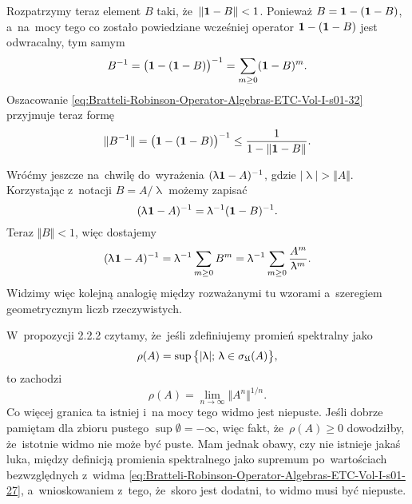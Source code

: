 \documentclass[a4paper,11pt]{article}
\renewcommand{\lambda}{\uplambda}
\begin{document}
Rozpatrzymy teraz element $B$ taki, że~$\Vert \mathbf{1} - B \Vert < 1$. Ponieważ
$B = \mathbf{1} - ( \mathbf{1} - B )$, a~na~mocy tego co zostało
powiedziane wcześniej operator $\mathbf{1} - ( \mathbf{1} - B )$ jest
odwracalny, tym samym
\begin{equation}
  \label{eq:Bratteli-Robinson-Operator-Algebras-ETC-Vol-I-s01-33}
  B^{ -1 } =
  \big( \mathbf{1} - ( \mathbf{1} - B ) \big)^{ -1 } =
  \sum_{ m \geq 0 } ( \mathbf{1} - B )^{ m }.
\end{equation}
Oszacowanie \eqref{eq:Bratteli-Robinson-Operator-Algebras-ETC-Vol-I-s01-32}
przyjmuje teraz formę
\begin{equation}
  \label{eq:Bratteli-Robinson-Operator-Algebras-ETC-Vol-I-s01-34}
  \Vert B^{ -1 } \Vert =
  \big( \mathbf{1} - ( \mathbf{1} - B ) \big)^{ -1 } \leq
  \frac{ 1 }{ 1 - \Vert \mathbf{1} - B \Vert }.
\end{equation}

Wróćmy jeszcze na~chwilę do~wyrażenia $( \lambda \UnitAlg - A )^{ -1 }$, gdzie
$| \lambda | > \Vert A \Vert$. Korzystając z~notacji $B = A / \lambda$ możemy zapisać
\begin{equation}
  \label{eq:Bratteli-Robinson-Operator-Algebras-ETC-Vol-I-s01-35}
  ( \lambda \HorSpaceOne \UnitAlg - A )^{ -1 } =
  \lambda^{ -1 } ( \UnitAlg - B )^{ -1 }.
\end{equation}
Teraz $\Vert B \Vert < 1$, więc dostajemy
\begin{equation}
  \label{eq:Bratteli-Robinson-Operator-Algebras-ETC-Vol-I-s01-36}
  ( \lambda \HorSpaceOne \UnitAlg - A )^{ -1 } =
  \lambda^{ -1 } \sum_{ m \geq 0 } B^{ m } =
  \lambda^{ -1 } \sum_{ m \geq 0 } \frac{ A^{ m } }{ \lambda^{ m } }.
\end{equation}
Widzimy więc kolejną analogię między rozważanymi tu wzorami a~szeregiem
geometrycznym liczb rzeczywistych.

\VerSpaceFour





\noindent
{} W~propozycji 2.2.2 czytamy, że~jeśli zdefiniujemy promień spektralny
jako
\begin{equation}
  \label{eq:Bratteli-Robinson-Operator-Algebras-ETC-Vol-I-s01-37}
  \rho( A ) =
  \sup\big\{ | \lambda |; \, \lambda \in \sigma_{ \Ufrak }( A ) \big\},
\end{equation}
to zachodzi
\begin{equation}
  \label{eq:Bratteli-Robinson-Operator-Algebras-ETC-Vol-I-s01-38}
  \rho( A ) =
  \lim_{ n \to \infty } \Vert A^{ n } \Vert^{ 1 / n }.
\end{equation}
Co więcej granica ta istniej i~na mocy tego widmo jest niepuste. Jeśli
dobrze pamiętam dla zbioru pustego $\sup \emptyset = -\infty$, więc fakt,
że~$\rho( A ) \geq 0$ dowodziłby, że~istotnie widmo nie może być puste. Mam jednak
obawy, czy nie istnieje jakaś luka, między definicją promienia spektralnego
jako supremum po~wartościach bezwzględnych z~widma
\eqref{eq:Bratteli-Robinson-Operator-Algebras-ETC-Vol-I-s01-27},
a~wnioskowaniem z~tego, że~skoro jest dodatni, to widmo musi być niepuste.
\end{document}
